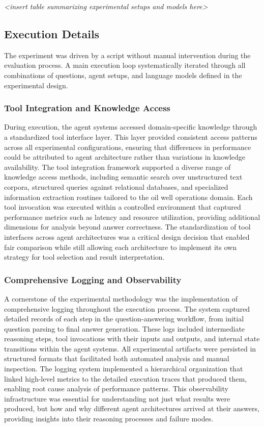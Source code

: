                 \textit{<insert table summarizing experimental setups and models here>}

        \subsection{Execution Details}

            The experiment was driven by a script without manual intervention during the evaluation process. A main execution loop systematically iterated through all combinations of questions, agent setups, and language models defined in the experimental design. 

            \subsubsection{Tool Integration and Knowledge Access}

            During execution, the agent systems accessed domain-specific knowledge through a standardized tool interface layer. This layer provided consistent access patterns across all experimental configurations, ensuring that differences in performance could be attributed to agent architecture rather than variations in knowledge availability. The tool integration framework supported a diverse range of knowledge access methods, including semantic search over unstructured text corpora, structured queries against relational databases, and specialized information extraction routines tailored to the oil well operations domain. Each tool invocation was executed within a controlled environment that captured performance metrics such as latency and resource utilization, providing additional dimensions for analysis beyond answer correctness. The standardization of tool interfaces across agent architectures was a critical design decision that enabled fair comparison while still allowing each architecture to implement its own strategy for tool selection and result interpretation.

            \subsubsection{Comprehensive Logging and Observability}

            A cornerstone of the experimental methodology was the implementation of comprehensive logging throughout the execution process. The system captured detailed records of each step in the question-answering workflow, from initial question parsing to final answer generation. These logs included intermediate reasoning steps, tool invocations with their inputs and outputs, and internal state transitions within the agent systems. All experimental artifacts were persisted in structured formats that facilitated both automated analysis and manual inspection. The logging system implemented a hierarchical organization that linked high-level metrics to the detailed execution traces that produced them, enabling root cause analysis of performance patterns. This observability infrastructure was essential for understanding not just what results were produced, but how and why different agent architectures arrived at their answers, providing insights into their reasoning processes and failure modes.

